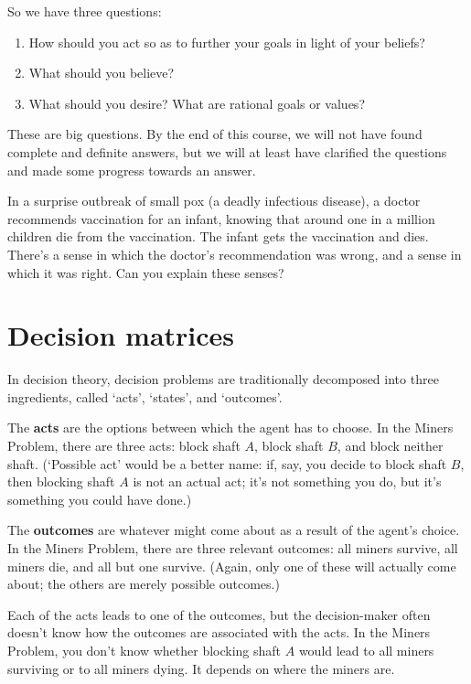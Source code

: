 So we have three questions:
\begin{enumerate}
  \itemsep0em 
\item How should you act so as to further your goals in light of
  your beliefs?
\item What should you believe?
\item What should you desire? What are rational goals or values?
\end{enumerate}
These are big questions. By the end of this course, we will not have
found complete and definite answers, but we will at least have
clarified the questions and made some progress towards an answer.

\begin{exercise}{2}
  In a surprise outbreak of small pox (a deadly infectious disease), a doctor
  recommends vaccination for an infant, knowing that around one in a million
  children die from the vaccination. The infant gets the vaccination and dies.
  There's a sense in which the doctor's recommendation was wrong, and a sense in
  which it was right. Can you explain these senses?
\end{exercise}


\section{Decision matrices}\label{sec:decision-matrices}

In decision theory, decision problems are traditionally decomposed into three
ingredients, called `acts', `states', and `outcomes'.

The \textbf{acts} are the options between which the agent has to choose. In the
Miners Problem, there are three acts: block shaft $A$, block shaft $B$, and
block neither shaft. (`Possible act' would be a better name: if, say, you
decide to block shaft $B$, then blocking shaft $A$ is not an actual act; it's
not something you do, but it's something you could have done.)

The \textbf{outcomes} are whatever might come about as a result of the agent's
choice. In the Miners Problem, there are three relevant outcomes: all miners
survive, all miners die, and all but one survive. (Again, only one of these will
actually come about; the others are merely possible outcomes.)

Each of the acts leads to one of the outcomes, but the decision-maker often
doesn't know how the outcomes are associated with the acts. In the Miners
Problem, you don't know whether blocking shaft $A$ would lead to all miners
surviving or to all miners dying. It depends on where the miners are.

